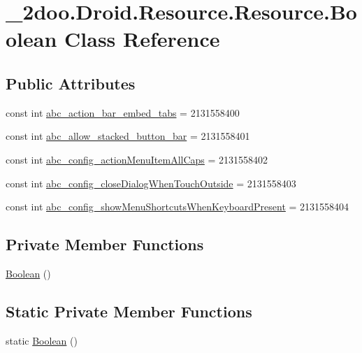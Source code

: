\hypertarget{class__2doo_1_1_droid_1_1_resource_1_1_boolean}{
\section{\_\-2doo.Droid.Resource.Resource.Boolean Class Reference}
\label{class__2doo_1_1_droid_1_1_resource_1_1_boolean}
}
\subsection*{Public Attributes}
\begin{CompactItemize}
\item 
const int \hyperlink{class__2doo_1_1_droid_1_1_resource_1_1_boolean_1778f92eb088c1e2a251c8135cc48d24}{abc\_\-action\_\-bar\_\-embed\_\-tabs} = 2131558400
\item 
const int \hyperlink{class__2doo_1_1_droid_1_1_resource_1_1_boolean_b87a34dd2faf7466ce1fc30121449484}{abc\_\-allow\_\-stacked\_\-button\_\-bar} = 2131558401
\item 
const int \hyperlink{class__2doo_1_1_droid_1_1_resource_1_1_boolean_a6a4a81eb25850e342f543f9bb619c80}{abc\_\-config\_\-actionMenuItemAllCaps} = 2131558402
\item 
const int \hyperlink{class__2doo_1_1_droid_1_1_resource_1_1_boolean_00d69cf4ebf7337b71c646970c2b72c3}{abc\_\-config\_\-closeDialogWhenTouchOutside} = 2131558403
\item 
const int \hyperlink{class__2doo_1_1_droid_1_1_resource_1_1_boolean_36f09a645e9d1b2111aa1f047d53dec3}{abc\_\-config\_\-showMenuShortcutsWhenKeyboardPresent} = 2131558404
\end{CompactItemize}
\subsection*{Private Member Functions}
\begin{CompactItemize}
\item 
\hyperlink{class__2doo_1_1_droid_1_1_resource_1_1_boolean_e0da100fe4ae8712ba0b896a50a0fae5}{Boolean} ()
\end{CompactItemize}
\subsection*{Static Private Member Functions}
\begin{CompactItemize}
\item 
static \hyperlink{class__2doo_1_1_droid_1_1_resource_1_1_boolean_59a19de72da5a1089debe4876b3eefd8}{Boolean} ()
\end{CompactItemize}


